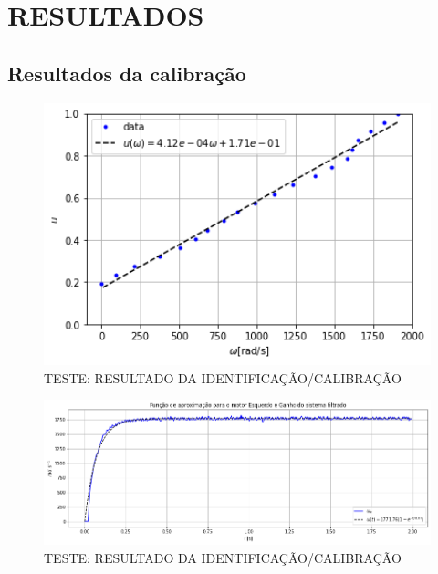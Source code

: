 \section{RESULTADOS}


% 


\subsection{Resultados da calibração}

\begin{figure}[H]
    \centering
    \includegraphics[width=13cm]{graficos/plot_test_calibration_result_feedforward.png}
    \caption{TESTE: RESULTADO DA IDENTIFICAÇÃO/CALIBRAÇÃO}
\end{figure}

\begin{figure}[H]
    \centering
    \includegraphics[width=13cm]{graficos/plot_test_identificacao.png}
    \caption{TESTE: RESULTADO DA IDENTIFICAÇÃO/CALIBRAÇÃO}
\end{figure}

